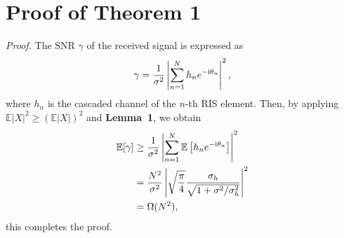 \documentclass[a4paper,12pt]{article}
\def \ri {{\rm i}}
\begin{document}
\appendix
\section{Proof of Theorem 1}
{\it {Proof.}} The SNR $\gamma$ of the received signal is expressed as 
\begin{equation}
    \gamma = \frac{1}{\sigma^2}\left| \sum_{n=1}^{N}h_n e^{-\ri \theta_n} \right|^2,
\end{equation}
where $h_n$ is the cascaded channel of the $n$-th RIS element. Then, by applying $\mathbb{E}|X|^2\geq (\mathbb{E}|X|)^2$ and {\bf Lemma~1}, we obtain 
\begin{equation}
    \begin{aligned}
    \mathbb{E}[\gamma] &\geq \frac{1}{\sigma^2}\left| \sum_{n=1}^{N}\mathbb{E}\left[h_n e^{-\ri \theta_n}\right] \right|^2 \\
    &= \frac{N^2}{\sigma^2} \left| \sqrt{\frac{\pi}{4}}\frac{\sigma_h}{\sqrt{1+\sigma^2/\sigma_h^2}} \right|^2 \\
    &= \Omega(N^2),
    \end{aligned}
\end{equation}
this completes the proof. 
\end{document}
